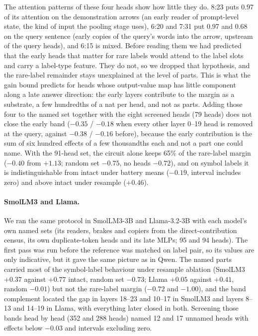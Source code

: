 \documentclass{article}
\begin{document}
The attention patterns of these four heads show how little they do. 8:23 puts 0.97 of its attention on the demonstration arrows (an early reader of prompt-level state, the kind of input the pooling stage uses), 6:20 and 7:31 put 0.97 and 0.68 on the query sentence (early copies of the query's words into the arrow, upstream of the query heads), and 6:15 is mixed. Before reading them we had predicted that the early heads that matter for rare labels would attend to the label slots and carry a label-type feature. They do not, so we dropped that hypothesis, and the rare-label remainder stays unexplained at the level of parts. This is what the gain bound predicts for heads whose output-value map has little component along a late answer direction: the early layers contribute to the margin as a substrate, a few hundredths of a nat per head, and not as parts. Adding those four to the named set together with the eight screened heads (79 heads) does not close the early band ($-0.35$ / $-0.18$ when every other layer 0--19 head is removed at the query, against $-0.38$ / $-0.16$ before), because the early contribution is the sum of six hundred effects of a few thousandths each and not a part one could name. With the 91-head set, the circuit alone keeps 65\% of the rare-label margin ($-0.40$ from $+1.13$; random set $-0.75$, no heads $-0.72$), and on symbol labels it is indistinguishable from intact under battery means ($-0.19$, interval includes zero) and above intact under resample ($+0.46$).

\paragraph{SmolLM3 and Llama.} We ran the same protocol in SmolLM3-3B and Llama-3.2-3B with each model's own named sets (its readers, brakes and copiers from the direct-contribution census, its own duplicate-token heads and its late MLPs; 95 and 94 heads). The first pass was run before the reference was matched on label pair, so its values are only indicative, but it gave the same picture as in Qwen. The named parts carried most of the symbol-label behaviour under resample ablation (SmolLM3 $+0.37$ against $+0.77$ intact, random set $-0.73$; Llama $+0.05$ against $+0.41$, random $-0.01$) but not the rare-label margin ($-0.72$ and $-1.00$), and the band complement located the gap in layers 18--23 and 10--17 in SmolLM3 and layers 8--13 and 14--19 in Llama, with everything later closed in both. Screening those bands head by head (352 and 288 heads) named 12 and 17 unnamed heads with effects below $-0.03$ and intervals excluding zero.
\end{document}
